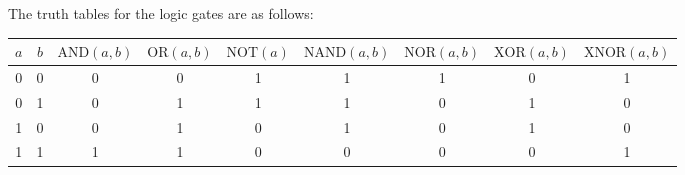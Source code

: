 \documentclass{book}
\begin{document}
\newpage
The truth tables for the logic gates are as follows:
\begin{center}
    \begin{tabular}{|c|c|c|c|c|c|c|c|c|}
        \hline
        \rowcolor{lightblue}
        \(a\) & \(b\) & \(\text{AND}(a, b)\) & \(\text{OR}(a, b)\) & \(\text{NOT}(a)\) & \(\text{NAND}(a, b)\) & \(\text{NOR}(a, b)\) & \(\text{XOR}(a, b)\) & \(\text{XNOR}(a, b)\)\\
        \hline
        0 & 0 & 0 & 0 & 1 & 1 & 1 & 0 & 1\\
        0 & 1 & 0 & 1 & 1 & 1 & 0 & 1 & 0\\
        1 & 0 & 0 & 1 & 0 & 1 & 0 & 1 & 0\\
        1 & 1 & 1 & 1 & 0 & 0 & 0 & 0 & 1\\
        \hline
    \end{tabular}
\end{center}
\end{document}
